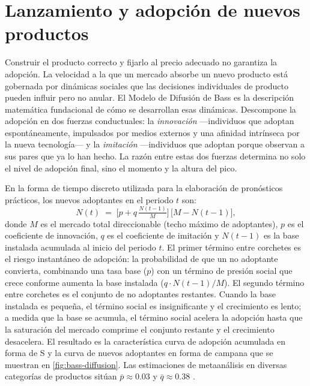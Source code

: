 \section{Lanzamiento y adopción de nuevos productos}\label{sec:adoption-curves}

Construir el producto correcto y fijarlo al precio adecuado no garantiza la adopción. La
velocidad a la que un mercado absorbe un nuevo producto está gobernada por dinámicas
sociales que las decisiones individuales de producto pueden influir pero no anular. El
Modelo de Difusión de Bass es la descripción matemática fundacional de cómo se desarrollan
esas dinámicas. Descompone la adopción en dos fuerzas conductuales: la \emph{innovación}
---individuos que adoptan espontáneamente, impulsados por medios externos y una afinidad
intrínseca por la nueva tecnología--- y la \emph{imitación} ---individuos que adoptan
porque observan a sus pares que ya lo han hecho. La razón entre estas dos fuerzas
determina no solo el nivel de adopción final, sino el momento y la altura del pico.

En la forma de tiempo discreto utilizada para la elaboración de pronósticos prácticos, los
nuevos adoptantes en el periodo \(t\) son:
\begin{equation}\label{eq:bass}
  N(t) \;=\; \bigl[p + q\,\tfrac{N(t-1)}{M}\bigr]\,\bigl[M - N(t-1)\bigr],
\end{equation}
donde \(M\) es el mercado total direccionable (techo máximo de adoptantes), \(p\) es el
coeficiente de innovación, \(q\) es el coeficiente de imitación y \(N(t-1)\) es la base
instalada acumulada al inicio del periodo \(t\). El primer término entre corchetes es el
riesgo instantáneo de adopción: la probabilidad de que un no adoptante convierta,
combinando una tasa base (\(p\)) con un término de presión social que crece conforme
aumenta la base instalada (\(q \cdot N(t-1)/M\)). El segundo término entre corchetes es
el conjunto de no adoptantes restantes. Cuando la base instalada es pequeña, el término
social es insignificante y el crecimiento es lento; a medida que la base se acumula, el
término social acelera la adopción hasta que la saturación del mercado comprime el conjunto
restante y el crecimiento desacelera. El resultado es la característica curva de adopción
acumulada en forma de S y la curva de nuevos adoptantes en forma de campana que se muestran
en \cref{fig:bass-diffusion}. Las estimaciones de metaanálisis en diversas categorías de
productos sitúan \(\bar{p} \approx 0.03\) y \(\bar{q} \approx 0.38\)
\parencite{bass1969newproduct}.


